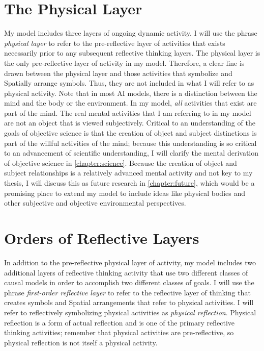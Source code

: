 \section{The Physical Layer}

My model includes three layers of ongoing dynamic activity.  I will
use the phrase \emph{physical layer} to refer to the pre-reflective
layer of activities that exists necessarily prior to any subsequent
reflective thinking layers.  The physical layer is the only
pre-reflective layer of activity in my model.  Therefore, a clear line
is drawn between the physical layer and those activities that
symbolize and Spatially arrange symbols.  Thus, they are not included
in what I will refer to as physical activity.  Note that in most AI
models, there is a distinction between the mind and the body or the
environment.  In my model, \emph{all} activities that exist are part
of the mind.  The real mental activities that I am referring to in my
model are not an object that is viewed subjectively.  Critical to an
understanding of the goals of objective science is that the creation
of object and subject distinctions is part of the willful activities
of the mind; because this understanding is so critical to an
advancement of scientific understanding, I will clarify the mental
derivation of objective science in \autoref{chapter:science}.  Because
the creation of object and subject relationships is a relatively
advanced mental activity and not key to my thesis, I will discuss this
as future research in \autoref{chapter:future}, which would be a
promising place to extend my model to include ideas like physical
bodies and other subjective and objective environmental perspectives.

\section{Orders of Reflective Layers}

In addition to the pre-reflective physical layer of activity, my model
includes two additional layers of reflective thinking activity that
use two different classes of causal models in order to accomplish two
different classes of goals.  I will use the phrase \emph{first-order
  reflective layer} to refer to the reflective layer of thinking that
creates symbols and Spatial arrangements that refer to physical
activities.  I will refer to reflectively symbolizing physical
activities as \emph{physical reflection}.  Physical reflection is a
form of actual reflection and is one of the primary reflective
thinking activities; remember that physical activities are
pre-reflective, so physical reflection is not itself a physical
activity.

